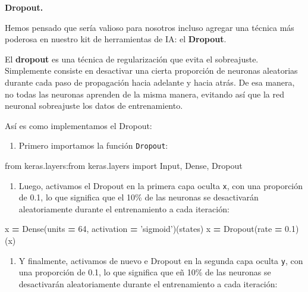\documentclass[]{book}
\newenvironment{Shaded}{\begin{snugshade}}{\end{snugshade}}
\newcommand{\DecValTok}[1]{\textcolor[rgb]{0.00,0.00,0.81}{#1}}
\newcommand{\FloatTok}[1]{\textcolor[rgb]{0.00,0.00,0.81}{#1}}
\newcommand{\ImportTok}[1]{#1}
\newcommand{\NormalTok}[1]{#1}
\newcommand{\OperatorTok}[1]{\textcolor[rgb]{0.81,0.36,0.00}{\textbf{#1}}}
\newcommand{\StringTok}[1]{\textcolor[rgb]{0.31,0.60,0.02}{#1}}
\providecommand{\tightlist}{%
  \setlength{\itemsep}{0pt}\setlength{\parskip}{0pt}}
\begin{document}
\textbf{Dropout.}

Hemos pensado que sería valioso para nosotros incluso agregar una técnica más poderosa en nuestro kit de herramientas de IA: el \textbf{Dropout}.

El \textbf{dropout} es una técnica de regularización que evita el sobreajuste. Simplemente consiste en desactivar una cierta proporción de neuronas aleatorias durante cada paso de propagación hacia adelante y hacia atrás. De esa manera, no todas las neuronas aprenden de la misma manera, evitando así que la red neuronal sobreajuste los datos de entrenamiento.

Así es como implementamos el Dropout:

\begin{enumerate}
\def\labelenumi{\arabic{enumi}.}
\tightlist
\item
  Primero importamos la función \texttt{Dropout}:
\end{enumerate}

\begin{Shaded}
\begin{Highlighting}[]
    \ImportTok{from}\NormalTok{ keras.layers:}\ImportTok{from}\NormalTok{ keras.layers }\ImportTok{import}\NormalTok{ Input, Dense, Dropout}
\end{Highlighting}
\end{Shaded}

\begin{enumerate}
\def\labelenumi{\arabic{enumi}.}
\setcounter{enumi}{1}
\tightlist
\item
  Luego, activamos el Dropout en la primera capa oculta \texttt{x}, con una proporción de 0.1, lo que significa que el 10\% de las neuronas se desactivarán aleatoriamente durante el entrenamiento a cada iteración:
\end{enumerate}

\begin{Shaded}
\begin{Highlighting}[]
\NormalTok{    x }\OperatorTok{=}\NormalTok{ Dense(units }\OperatorTok{=} \DecValTok{64}\NormalTok{, activation }\OperatorTok{=} \StringTok{'sigmoid'}\NormalTok{)(states)}
\NormalTok{    x }\OperatorTok{=}\NormalTok{ Dropout(rate }\OperatorTok{=} \FloatTok{0.1}\NormalTok{)(x)}
\end{Highlighting}
\end{Shaded}

\begin{enumerate}
\def\labelenumi{\arabic{enumi}.}
\setcounter{enumi}{2}
\tightlist
\item
  Y finalmente, activamos de nuevo e Dropout en la segunda capa oculta \texttt{y}, con una proporción de 0.1, lo que significa que eñ 10\% de las neuronas se desactivarán aleatoriamente durante el entrenamiento a cada iteración:
\end{enumerate}
\end{document}
